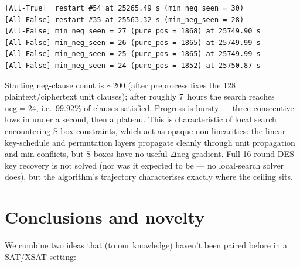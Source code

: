 \documentclass[11pt]{article}
\begin{document}
\begin{verbatim}
[All-True]  restart #54 at 25265.49 s (min_neg_seen = 30)
[All-False] restart #35 at 25563.32 s (min_neg_seen = 28)
[All-False] min_neg_seen = 27 (pure_pos = 1868) at 25749.90 s
[All-False] min_neg_seen = 26 (pure_pos = 1865) at 25749.99 s
[All-False] min_neg_seen = 25 (pure_pos = 1865) at 25749.99 s
[All-False] min_neg_seen = 24 (pure_pos = 1852) at 25750.87 s
\end{verbatim}
Starting neg-clause count is $\sim 200$ (after preprocess fixes the
128 plaintext/ciphertext unit clauses); after roughly 7~hours the
search reaches $\text{neg} = 24$, i.e.\ $99.92\%$ of clauses
satisfied. Progress is bursty — three consecutive lows in under a
second, then a plateau. This is characteristic of local search
encountering S-box constraints, which act as opaque non-linearities:
the linear key-schedule and permutation layers propagate cleanly
through unit propagation and min-conflicts, but S-boxes have no
useful $\Delta\mathrm{neg}$ gradient. Full 16-round DES key recovery
is not solved (nor was it expected to be — no local-search solver
does), but the algorithm's trajectory characterises exactly where
the ceiling sits.

\section{Conclusions and novelty}
\label{sec:conclusions}

We combine two ideas that (to our knowledge) haven't been paired
before in a SAT/XSAT setting:
\end{document}
